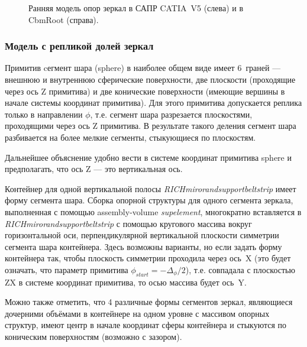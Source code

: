 \begin{figure}[H]
\begin{minipage}[b]{0.495\textwidth}
\end{minipage}
\caption{Ранняя модель опор зеркал в САПР CATIA~V5 (слева) и в CbmRoot (справа).}
\label{fig:SmallFrameCADandMC}
\end{figure}

\subsubsection{Модель с репликой долей зеркал}\label{sec:secModelWithReplMirrors}

Примитив cегмент шара (sphere) в наиболее общем виде имеет 6~граней --- внешнюю и внутреннюю сферические поверхности, две плоскости (проходящие через ось Z примитива) и две конические поверхности (имеющие вершины в начале системы координат примитива).
Для этого примитива допускается реплика только в направлении $\phi$, т.е. сегмент шара разрезается плоскостями, проходящими через ось Z примитива. В результате такого деления сегмент шара разбивается на более мелкие сегменты, стыкующиеся по плоскостям.

Дальнейшее объяснение удобно вести в системе координат примитива sphere и предполагать, что ось Z --- это вертикальная ось.

Контейнер для одной вертикальной полосы
\textit{RICH\textunderscore miror\textunderscore and\textunderscore support\textunderscore belt\textunderscore strip}
имеет форму сегмента шара.
Сборка опорной структуры для одного сегмента зеркала, выполненная с помощью assembly-volume \textit{sup\textunderscore element}, многократно вставляется в
\textit{RICH\textunderscore miror\textunderscore and\textunderscore support\textunderscore belt\textunderscore strip}
с помощью кругового массива вокруг горизонтальной оси, перпендикулярной вертикальной плоскости симметрии сегмента шара контейнера. Здесь возможны варианты, но если задать форму контейнера так, чтобы плоскость симметрии проходила через ось~X (это будет означать, что параметр примитива $\phi_{start} = -\Delta_{\phi}/2$), т.е. совпадала с плоскостью ZX в системе координат примитива, то осью массива будет ось~Y.

Можно также отметить, что 4 различные формы сегментов зеркал, являющиеся дочерними объёмами в контейнере на одном уровне с массивом опорных структур, имеют центр в начале координат сферы контейнера и стыкуются по коническим поверхностям (возможно с зазором).

